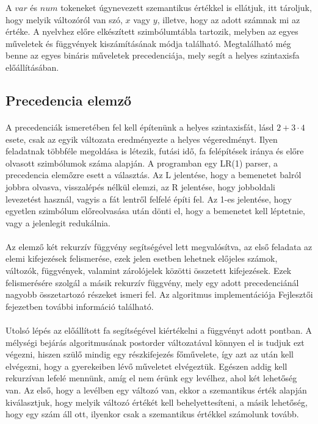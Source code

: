 \documentclass[12pt]{report}
\begin{document}
A $var$ és $num$ tokeneket úgynevezett szemantikus értékkel is ellátjuk, itt tároljuk, hogy melyik változóról van szó, $x$ vagy $y$, illetve, hogy az adott számnak mi az értéke. A nyelvhez előre elkészített szimbólumtábla tartozik, melyben az egyes műveletek és függvények kiszámításának módja található. Megtalálható még benne az egyes bináris műveletek precedenciája, mely segít a helyes szintaxisfa előállításában.

\subsection{Precedencia elemző}
\paragraph{}
A precedenciák ismeretében fel kell építenünk a helyes szintaxisfát, lásd $2+3\cdot4$ esete, csak az egyik változata eredményezte a helyes végeredményt. Ilyen feladatnak többféle megoldása is létezik, futási idő, fa felépítések iránya és előre olvasott szimbólumok száma alapján. A programban egy LR(1) parser, a precedencia elemőzre esett a választás. Az L jelentése, hogy a bemenetet balról jobbra olvasva, visszalépés nélkül elemzi, az R jelentése, hogy jobboldali levezetést használ, vagyis a fát lentről felfelé építi fel. Az 1-es jelentése, hogy egyetlen szimbólum előreolvasása után dönti el, hogy a bemenetet kell léptetnie, vagy a jelenlegit redukálnia.
\paragraph{}
Az elemző két rekurzív függvény segítségével lett megvalósítva, az első feladata az elemi kifejezések felismerése, ezek jelen esetben lehetnek előjeles számok, változók, függvények, valamint zárolójelek közötti összetett kifejezések. Ezek felismerésére szolgál a másik rekurzív függvény, mely egy adott precedenciánál nagyobb összetartozó részeket ismeri fel. Az algoritmus implementációja Fejlesztői fejezetben további információ található.
\paragraph{}
Utolsó lépés az előállított fa segítségével kiértékelni a függvényt adott pontban. A mélységi bejárás algoritmusának postorder változatával könnyen el is tudjuk ezt végezni, hiszen szülő mindig egy részkifejezés főművelete, így azt az után kell elvégezni, hogy a gyerekeiben lévő műveletet elvégeztük. Egészen addig kell rekurzívan lefelé mennünk, amíg el nem érünk egy levélhez, ahol két lehetőség van. Az első, hogy a levélben egy változó van, ekkor a szemantikus érték alapján kiválasztjuk, hogy melyik változó értékét kell behelyettesíteni, a másik lehetőség, hogy egy szám áll ott, ilyenkor csak a szemantikus értékkel számolunk tovább.
\end{document}
